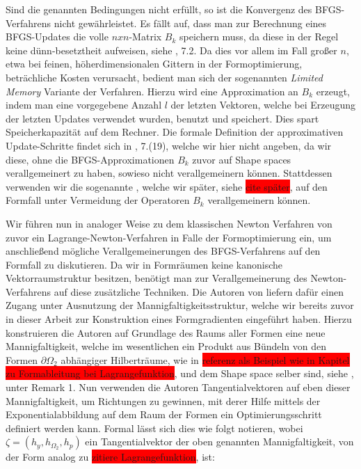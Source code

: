 \documentclass[bibliography=totoc,12pt,a4paper]{scrartcl}
\theoremstyle{exampstyle}
\numberwithin{equation}{section}
\begin{document}
Sind die genannten Bedingungen nicht erfüllt, so ist die Konvergenz des BFGS-Verfahrens nicht gewährleistet. Es fällt auf, dass man zur Berechnung eines BFGS-Updates die volle $nxn$-Matrix $B_k$ speichern muss, da diese in der Regel keine dünn-besetztheit aufweisen, siehe \cite{Nocedal}, 7.2. Da dies vor allem im Fall großer $n$, etwa bei feinen, höherdimensionalen Gittern in der Formoptimierung, beträchliche Kosten verursacht, bedient man sich der sogenannten \textit{Limited Memory} Variante der Verfahren. Hierzu wird eine Approximation an $B_k$ erzeugt, indem man eine vorgegebene Anzahl $l$ der letzten Vektoren, welche bei Erzeugung der letzten Updates verwendet wurden, benutzt und speichert. Dies spart Speicherkapazität auf dem Rechner. Die formale Definition der approximativen Update-Schritte findet sich in \cite{Nocedal}, 7.(19), welche wir hier nicht angeben, da wir diese, ohne die BFGS-Approximationen $B_k$ zuvor auf Shape spaces verallgemeinert zu haben, sowieso nicht verallgemeinern können. Stattdessen verwenden wir die sogenannte \cite{2-Schleifen-L-BFGS Rekusion}, welche wir später, siehe \colorbox{red}{cite später}, auf den Formfall unter Vermeidung der Operatoren $B_k$ verallgemeinern können.

Wir führen nun in analoger Weise zu dem klassischen Newton Verfahren von zuvor ein Lagrange-Newton-Verfahren in Falle der Formoptimierung ein, um anschließend mögliche Verallgemeinerungen des BFGS-Verfahrens auf den Formfall zu diskutieren.
Da wir in Formräumen keine kanonische Vektorraumstruktur besitzen, benötigt man zur Verallgemeinerung des Newton-Verfahrens auf diese zusätzliche Techniken.
Die Autoren von \cite{LagrangeNewton} liefern dafür einen Zugang unter Ausnutzung der Mannigfaltigkeitsstruktur, welche wir bereits zuvor in dieser Arbeit zur Konstruktion eines Formgradienten eingeführt haben. Hierzu konstruieren die Autoren auf Grundlage des Raums aller Formen eine neue Mannigfaltigkeit, welche im wesentlichen ein Produkt aus Bündeln von den Formen $\partial\Omega_2$ abhängiger Hilberträume, wie in \colorbox{red}{referenz als Beispiel wie in Kapitel zu Formableitung bei Lagrangefunktion}, und dem Shape space selber sind, siehe \cite{LagrangeNewton}, unter Remark 1.  Nun verwenden die Autoren Tangentialvektoren auf eben dieser Mannigfaltigkeit, um Richtungen zu gewinnen, mit derer Hilfe mittels der Exponentialabbildung auf dem Raum der Formen ein Optimierungsschritt definiert werden kann. Formal lässt sich dies wie folgt notieren, wobei $\zeta = (h_y, h_{\Omega_2}, h_p)$ ein Tangentialvektor der oben genannten Mannigfaltigkeit, von der Form analog zu \colorbox{red}{zitiere Lagrangefunktion}, ist:
\end{document}
